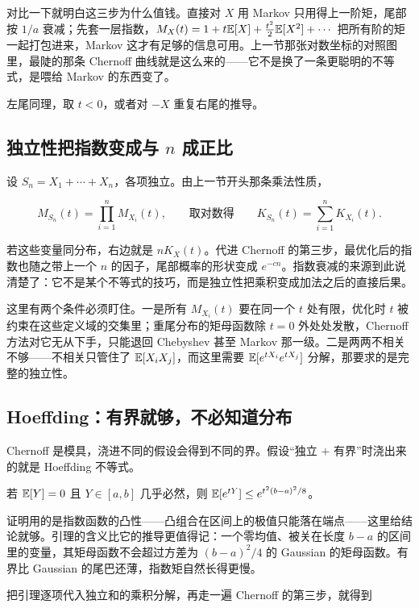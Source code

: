 对比一下就明白这三步为什么值钱。直接对 \(X\) 用 Markov 只用得上一阶矩，尾部按 \(1/a\) 衰减；先套一层指数，\(M_X(t)=1+t\mathbb{E}[X]+\frac{t^2}{2}\mathbb{E}[X^2]+\cdots\) 把所有阶的矩一起打包进来，Markov 这才有足够的信息可用。上一节那张对数坐标的对照图里，最陡的那条 Chernoff 曲线就是这么来的——它不是换了一条更聪明的不等式，是喂给 Markov 的东西变了。

左尾同理，取 \(t<0\)，或者对 \(-X\) 重复右尾的推导。

\subsection{独立性把指数变成与 \texorpdfstring{\(n\)}{n} 成正比}

设 \(S_n=X_1+\cdots+X_n\)，各项独立。由上一节开头那条乘法性质，

\[
M_{S_n}(t)=\prod_{i=1}^nM_{X_i}(t),
\qquad\text{取对数得}\qquad
K_{S_n}(t)=\sum_{i=1}^nK_{X_i}(t).
\]

若这些变量同分布，右边就是 \(nK_X(t)\)。代进 Chernoff 的第三步，最优化后的指数也随之带上一个 \(n\) 的因子，尾部概率的形状变成 \(e^{-cn}\)。指数衰减的来源到此说清楚了：它不是某个不等式的技巧，而是独立性把乘积变成加法之后的直接后果。

这里有两个条件必须盯住。一是所有 \(M_{X_i}(t)\) 要在同一个 \(t\) 处有限，优化时 \(t\) 被约束在这些定义域的交集里；重尾分布的矩母函数除 \(t=0\) 外处处发散，Chernoff 方法对它无从下手，只能退回 Chebyshev 甚至 Markov 那一级。二是两两不相关不够——不相关只管住了 \(\mathbb{E}[X_iX_j]\)，而这里需要 \(\mathbb{E}[e^{tX_i}e^{tX_j}]\) 分解，那要求的是完整的独立性。

\subsection{Hoeffding：有界就够，不必知道分布}

Chernoff 是模具，浇进不同的假设会得到不同的界。假设``独立 \(+\) 有界''时浇出来的就是 Hoeffding 不等式。

\begin{lemma}[Hoeffding 引理]
若 \(\mathbb{E}[Y]=0\) 且 \(Y\in[a,b]\) 几乎必然，则 \(\mathbb{E}[e^{tY}]\le e^{t^2(b-a)^2/8}\)。
\end{lemma}

证明用的是指数函数的凸性——凸组合在区间上的极值只能落在端点——这里给结论就够。引理的含义比它的推导更值得记：一个零均值、被关在长度 \(b-a\) 的区间里的变量，其矩母函数不会超过方差为 \((b-a)^2/4\) 的 Gaussian 的矩母函数。有界比 Gaussian 的尾巴还薄，指数矩自然长得更慢。

把引理逐项代入独立和的乘积分解，再走一遍 Chernoff 的第三步，就得到

